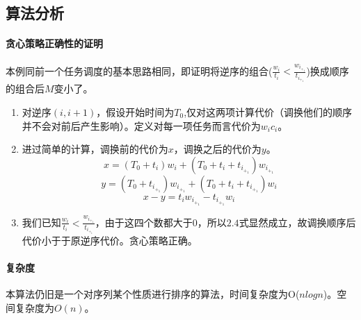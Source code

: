 \subsection{算法分析}

\paragraph*{贪心策略正确性的证明}
本例同前一个任务调度的基本思路相同，即证明将逆序的组合($\frac{w_i}{t_i} < \frac{w_i_+_1}{t_i_+_1}$)换成顺序的组合后$M$变小了。

\begin{enumerate}
    \item 对逆序$(i,i+1)$，假设开始时间为$T_0$,仅对这两项计算代价（调换他们的顺序并不会对前后产生影响）。定义对每一项任务而言代价为$w_ic_i$。
    \item 进过简单的计算，调换前的代价为$x$，调换之后的代价为$y$。
    \begin{equation}
        x=(T_0+t_i)w_i+(T_0+t_i+t_i_+_1)w_i_+_1
    \end{equation}
    \begin{equation}
        y=(T_0+t_i_+_1)w_i_+_1+(T_0+t_i+t_i_+_1)w_i
    \end{equation}
    \begin{equation}
        x-y=t_iw_i_+_1-t_i_+_1w_i
    \end{equation}
    \item 我们已知$\frac{w_i}{t_i} < \frac{w_i_+_1}{t_i_+_1}$，由于这四个数都大于0，所以$2.4$式显然成立，故调换顺序后代价小于于原逆序代价。贪心策略正确。
\end{enumerate}

\paragraph*{复杂度}
本算法仍旧是一个对序列某个性质进行排序的算法，时间复杂度为O($nlogn$)。空间复杂度为$O(n)$。
